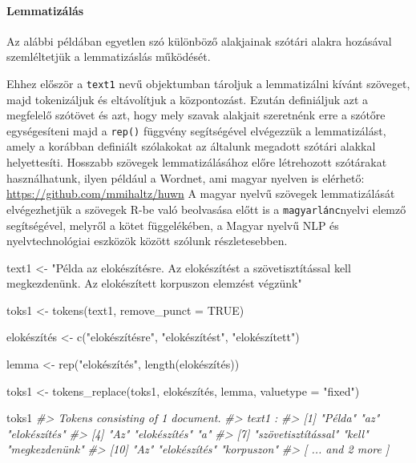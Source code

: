 \documentclass[
]{book}
\newenvironment{Shaded}{\begin{snugshade}}{\end{snugshade}}
\newcommand{\AttributeTok}[1]{\textcolor[rgb]{0.77,0.63,0.00}{#1}}
\newcommand{\CommentTok}[1]{\textcolor[rgb]{0.56,0.35,0.01}{\textit{#1}}}
\newcommand{\ConstantTok}[1]{\textcolor[rgb]{0.00,0.00,0.00}{#1}}
\newcommand{\FunctionTok}[1]{\textcolor[rgb]{0.00,0.00,0.00}{#1}}
\newcommand{\NormalTok}[1]{#1}
\newcommand{\OtherTok}[1]{\textcolor[rgb]{0.56,0.35,0.01}{#1}}
\newcommand{\StringTok}[1]{\textcolor[rgb]{0.31,0.60,0.02}{#1}}
\begin{document}
\hypertarget{lemmatizuxe1luxe1s}{%
\paragraph{Lemmatizálás}\label{lemmatizuxe1luxe1s}}

Az alábbi példában egyetlen szó különböző alakjainak szótári alakra
hozásával szemléltetjük a lemmatizáslás működését.

Ehhez először a \texttt{text1} nevű objektumban tároljuk a lemmatizálni
kívánt szöveget, majd tokenizáljuk és eltávolítjuk a központozást.
Ezután definiáljuk azt a megfelelő szótövet és azt, hogy mely szavak
alakjait szeretnénk erre a szótőre egységesíteni majd a \texttt{rep()}
függvény segítségével elvégezzük a lemmatizálást, amely a korábban
definiált szólakokat az általunk megadott szótári alakkal helyettesíti.
Hosszabb szövegek lemmatizálásához előre létrehozott szótárakat
használhatunk, ilyen például a Wordnet, ami magyar nyelven is elérhető:
\url{https://github.com/mmihaltz/huwn} A magyar nyelvű szövegek
lemmatizálását elvégezhetjük a szövegek R-be való beolvasása előtt is a
\texttt{magyarlánc}nyelvi elemző segítségével, melyről a kötet
függelékében, a Magyar nyelvű NLP és nyelvtechnológiai eszközök között
szólunk részletesebben.

\begin{Shaded}
\begin{Highlighting}[]

\NormalTok{text1 }\OtherTok{\textless{}{-}} \StringTok{"Példa az elokészítésre. Az elokészítést a szövetisztítással kell megkezdenünk. Az elokészített korpuszon elemzést végzünk"}

\NormalTok{toks1 }\OtherTok{\textless{}{-}} \FunctionTok{tokens}\NormalTok{(text1, }\AttributeTok{remove\_punct =} \ConstantTok{TRUE}\NormalTok{)}

\NormalTok{elokészítés }\OtherTok{\textless{}{-}} \FunctionTok{c}\NormalTok{(}\StringTok{"elokészítésre"}\NormalTok{, }\StringTok{"elokészítést"}\NormalTok{, }\StringTok{"elokészített"}\NormalTok{)}

\NormalTok{lemma }\OtherTok{\textless{}{-}} \FunctionTok{rep}\NormalTok{(}\StringTok{"elokészítés"}\NormalTok{, }\FunctionTok{length}\NormalTok{(elokészítés))}

\NormalTok{toks1 }\OtherTok{\textless{}{-}} \FunctionTok{tokens\_replace}\NormalTok{(toks1, elokészítés, lemma, }\AttributeTok{valuetype =} \StringTok{"fixed"}\NormalTok{)}

\NormalTok{toks1}
\CommentTok{\#\textgreater{} Tokens consisting of 1 document.}
\CommentTok{\#\textgreater{} text1 :}
\CommentTok{\#\textgreater{}  [1] "Példa"             "az"                "elokészítés"      }
\CommentTok{\#\textgreater{}  [4] "Az"                "elokészítés"       "a"                }
\CommentTok{\#\textgreater{}  [7] "szövetisztítással" "kell"              "megkezdenünk"     }
\CommentTok{\#\textgreater{} [10] "Az"                "elokészítés"       "korpuszon"        }
\CommentTok{\#\textgreater{} [ ... and 2 more ]}
\end{Highlighting}
\end{Shaded}
\end{document}

